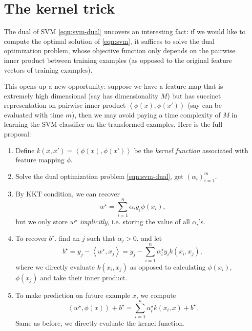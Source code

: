 \documentclass{article}
\DeclareMathOperator*{\maximize}{{\rm maximize}}
\DeclareMathOperator*{\st}{{\rm s.t.}}
\newcommand{\inner}[2]{\left\langle #1,#2 \right\rangle}
\begin{document}

\section{The kernel trick}
The dual of SVM \eqref{eqn:svm-dual} uncovers an interesting fact: if we would like to compute the optimal solution of \eqref{eqn:svm}, it suffices to solve the dual optimization problem, whose
objective function only depends on the pairwise inner product between training examples (as opposed to the original feature vectors of training examples).

This opens up a new opportunity: suppose we have a feature map that is extremely high dimensional (say has dimensionality $M$) but has succinct representation on pairwise inner product $\inner{\phi(x)}{\phi(x')}$ (say can be evaluated with time $m$), then we may avoid paying a time complexity of $M$ in learning the SVM classifier on the transformed examples.
Here is the full proposal:
\begin{enumerate}
\item Define $k(x,x') = \inner{\phi(x)}{\phi(x')}$ be the {\em kernel function} associated with feature mapping $\phi$.
\item Solve the dual optimization problem \eqref{eqn:svm-dual}, get $(\alpha_i)_{i=1}^m$.
\item By KKT condition, we can recover
\[ w^\star = \sum_{i=1}^n \alpha_i y_i \phi(x_i), \]
but we only store $w^\star$ {\em implicitly}, i.e. storing the value of all $\alpha_i$'s.
\item To recover $b^\star$, find an $j$ such that $\alpha_j > 0$, and let
\[ b^\star = y_j - \inner{w^\star}{x_j} = y_j - \sum_{i=1}^n \alpha_i^\star y_i k(x_i, x_j), \]
where we directly evaluate $k(x_i, x_j)$ as opposed to calculating $\phi(x_i)$, $\phi(x_j)$ and take their inner product.
\item To make prediction on future example $x$, we compute
\[ \inner{w^\star}{\phi(x)} + b^\star = \sum_{i=1}^n \alpha_i^\star k(x_i, x) + b^\star. \]
Same as before, we directly evaluate the kernel function.
\end{enumerate}
\end{document}
